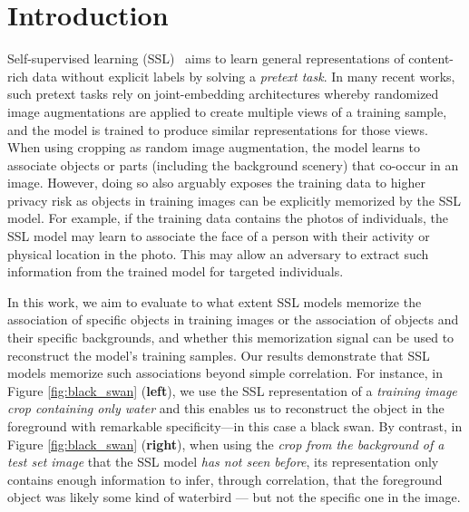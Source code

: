 \section{Introduction}
\label{sec:intro}
Self-supervised learning (SSL)~\citep{chen2020simclr, chen2020simsiam, zbontar2021barlow, vicreg, caron2020swav, MAE} aims to learn general representations of content-rich data without explicit labels by solving a \textit{pretext task}. In many recent works, such pretext tasks rely on joint-embedding architectures whereby randomized image augmentations are applied to create multiple views of a training sample, and the model is trained to produce similar representations for those views. When using cropping as random image augmentation, the model learns to associate objects or parts (including the background scenery) that co-occur in an image.
However, doing so also arguably exposes the training data to higher privacy risk as objects in training images can be explicitly memorized by the SSL model. For example, if the training data contains the photos of individuals, the SSL model may learn to associate the face of a person with their activity or physical location in the photo. This may allow an adversary to extract such information from the trained model for targeted individuals.



In this work, we aim to evaluate to what extent SSL models memorize the association of specific objects in training images or the association of objects and their specific backgrounds, and whether this memorization signal can be used to reconstruct the model's training samples. Our results demonstrate that SSL models memorize such associations beyond simple correlation. For instance, in Figure \ref{fig:black_swan} (\textbf{left}), we use the SSL representation of a \emph{training image crop containing only water} and this enables us to reconstruct the object in the foreground with remarkable specificity---in this case a black swan.
By contrast, in Figure \ref{fig:black_swan} (\textbf{right}), when using the \emph{crop from the background of a test set image} that the SSL model \emph{has not seen before}, its representation only contains enough information to infer, through correlation, that the foreground object was likely some kind of waterbird --- but not the specific one in the image.

